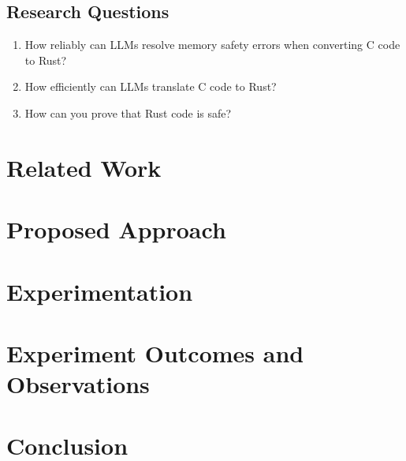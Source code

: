 \documentclass[conference]{IEEEtran}
\begin{document}
\subsection{Research Questions}
\begin{enumerate}
    \item How reliably can LLMs resolve memory safety errors when converting 
        C code to Rust?
    \item How efficiently can LLMs translate C code to Rust?
    \item How can you prove that Rust code is safe?
\end{enumerate}


\section{Related Work}

\section{Proposed Approach}

\section{Experimentation}

\section{Experiment Outcomes and Observations}

\section{Conclusion}



\end{document}
